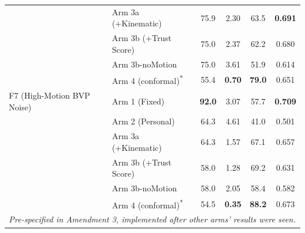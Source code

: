 \begin{table}[t]
\begin{tabular}{|l|l|c|c|c|c|}
                             & Arm 3a (+Kinematic)                  &  75.9 &  2.30 &  63.5 & \textbf{0.691} \\
                             & Arm 3b (+Trust Score)                &  75.0 &  2.37 &  62.2 & 0.680 \\
                             & Arm 3b-noMotion                      &  75.0 &  3.61 &  51.9 & 0.614 \\
                             & Arm 4 (conformal)\textsuperscript{*} &  55.4 & \textbf{0.70} & \textbf{79.0} & 0.651 \\
\hline
F7 (High-Motion BVP Noise)   & Arm 1 (Fixed)                        & \textbf{92.0} &  3.07 &  57.7 & \textbf{0.709} \\
                             & Arm 2 (Personal)                     &  64.3 &  4.61 &  41.0 & 0.501 \\
                             & Arm 3a (+Kinematic)                  &  64.3 &  1.57 &  67.1 & 0.657 \\
                             & Arm 3b (+Trust Score)                &  58.0 &  1.28 &  69.2 & 0.631 \\
                             & Arm 3b-noMotion                      &  58.0 &  2.05 &  58.4 & 0.582 \\
                             & Arm 4 (conformal)\textsuperscript{*} &  54.5 & \textbf{0.35} & \textbf{88.2} & 0.673 \\
\hline
\multicolumn{6}{l}{\scriptsize *\textit{Pre-specified in Amendment 3, implemented after other arms' results were seen.}} \\
\hline
\end{tabular}
\end{table}
